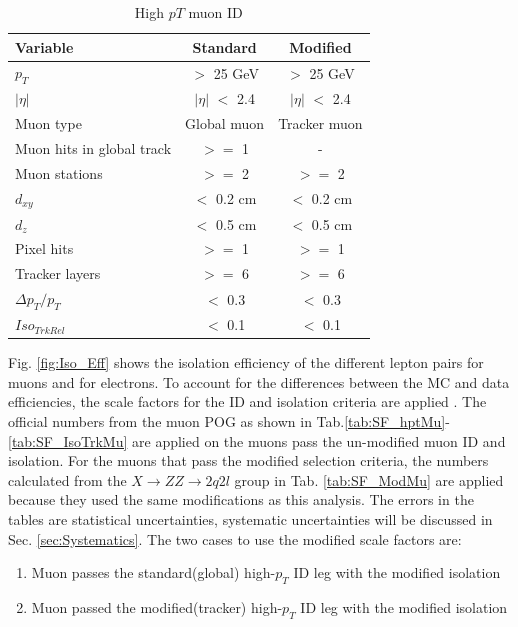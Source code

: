 \begin{table}[hp]
\begin{center}
\begin{tabular}{|l|c|c|}
\hline
Variable & Standard & Modified \\
\hline
$p_{T}$ & $>$ 25 GeV & $>$ 25 GeV \\
$|\eta|$ & $|\eta|$ $<$ 2.4 &  $|\eta|$ $<$ 2.4 \\
Muon type & Global muon & Tracker muon \\
Muon hits in global track & $>=$ 1 & - \\
Muon stations & $>=$ 2 & $>=$ 2 \\
$d_{xy}$ & $<$ 0.2 cm & $<$ 0.2 cm\\
$d_{z}$ & $<$ 0.5 cm & $<$ 0.5 cm\\
Pixel hits & $>=$ 1 & $>=$ 1 \\
Tracker layers & $>=$ 6 & $>=$ 6 \\
$\Delta p_{T}/p_{T}$ & $<$ 0.3 & $<$ 0.3 \\
\hline
$Iso_{TrkRel}$  & $<$ 0.1 & $<$ 0.1 \\
\hline
\end{tabular}
\caption{High $p{T}$ muon ID}
\label{tab:muid}
\end{center}
\end{table}


Fig. \ref{fig:Iso_Eff} shows the isolation efficiency of the different lepton pairs for muons and for electrons. To account for the differences between the MC and data efficiencies, the scale factors for the ID and isolation criteria are applied \cite{muoneff, muonresol, muoniso, muonTP}. The official numbers from the muon POG as shown in Tab.\ref{tab:SF_hptMu}-\ref{tab:SF_IsoTrkMu} are applied on the muons pass the un-modified muon ID and isolation. For the muons that pass the modified selection criteria, the numbers calculated from the $X \rightarrow ZZ \rightarrow 2q2l$ group \cite{XToZZTollqq} in Tab. \ref{tab:SF_ModMu} are applied because they used the same modifications as this analysis. The errors in the tables are statistical uncertainties, systematic uncertainties will be discussed in Sec. \ref{sec:Systematics}. The two cases to use the modified scale factors are:

\begin{enumerate}
	\item Muon passes the standard(global) high-$p_{T}$ ID leg with the modified isolation
	\item Muon passed the modified(tracker) high-$p_{T}$ ID leg with the modified isolation
\end{enumerate}

